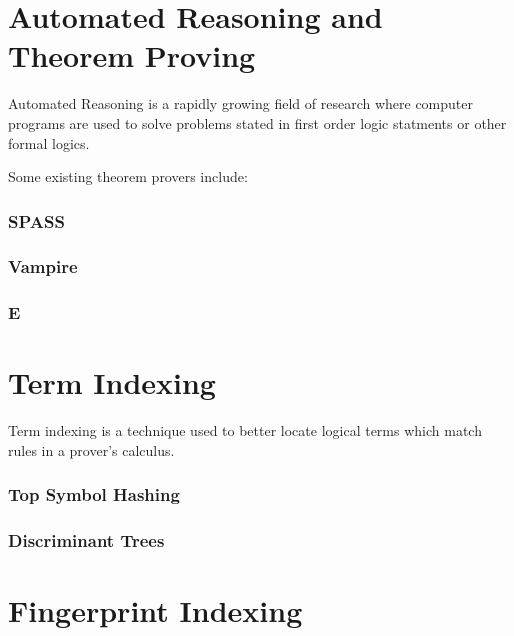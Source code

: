 \section{Automated Reasoning and Theorem Proving}
\label{sec:proving}

Automated Reasoning is a rapidly growing field of research where computer programs
are used to solve problems stated in first order logic statments or other formal logics.

Some existing theorem provers include:

\subsubsection*{SPASS}
\cite{spass}

\subsubsection*{Vampire}
\cite{vampire}

\subsubsection*{E}
\cite{eprover}


\section{Term Indexing}
\label{sec:indexing}

Term indexing is a technique used to better locate logical terms which match rules
in a prover's calculus.

\subsubsection*{Top Symbol Hashing}

\subsubsection*{Discriminant Trees}


\section{Fingerprint Indexing}
\label{sec:fingerprint}

